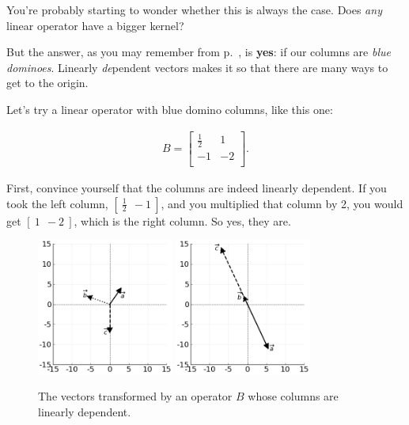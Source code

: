 You're probably starting to wonder whether this is always the case. Does
\textit{any} linear operator have a bigger kernel?

But the answer, as you may remember from p.~\pageref{trivialSolution}, is
\textbf{yes}: if our columns are \textit{blue dominoes}. Linearly
\textit{de}pendent vectors makes it so that there are many ways to get to the
origin.

Let's try a linear operator with blue domino columns, like this one:

\vspace{-.15in}
\begin{align*}
B =
\begin{bmatrix}
\frac{1}{2} & 1 \\
-1 & -2 \\
\end{bmatrix}.
\end{align*}
\vspace{-.15in}

First, convince yourself that the columns are indeed linearly dependent. If
you took the left column, $[\ \frac{1}{2} \ \ -1\ ]$, and you multiplied that
column by 2, you would get $[\ 1\ \ -2\ ]$, which is the right column. So yes,
they are.

\begin{figure}[ht]
\centering
\includegraphics[width=0.40\textwidth]{preoperators.png}
\includegraphics[width=0.40\textwidth]{bluedominoesop.png}
\caption[.]{The vectors transformed by an operator $B$ whose columns are
linearly dependent.}
\label{fig:bluedominoesop}
\end{figure}

